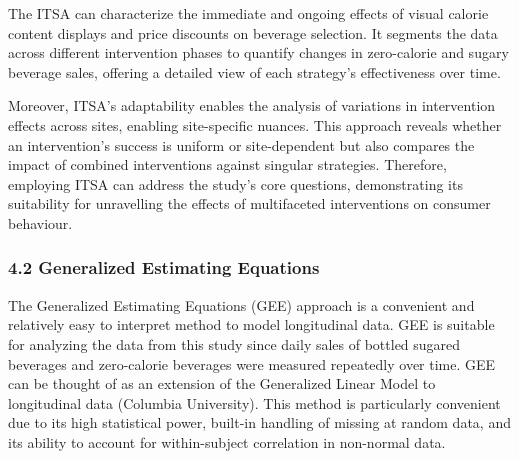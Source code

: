\documentclass[
]{article}
\begin{document}
The ITSA can characterize the immediate and ongoing effects of visual
calorie content displays and price discounts on beverage selection. It
segments the data across different intervention phases to quantify
changes in zero-calorie and sugary beverage sales, offering a detailed
view of each strategy's effectiveness over time.

Moreover, ITSA's adaptability enables the analysis of variations in
intervention effects across sites, enabling site-specific nuances. This
approach reveals whether an intervention's success is uniform or
site-dependent but also compares the impact of combined interventions
against singular strategies. Therefore, employing ITSA can address the
study's core questions, demonstrating its suitability for unravelling
the effects of multifaceted interventions on consumer behaviour.

\hypertarget{generalized-estimating-equations}{%
\subsubsection{4.2 Generalized Estimating
Equations}\label{generalized-estimating-equations}}

The Generalized Estimating Equations (GEE) approach is a convenient and
relatively easy to interpret method to model longitudinal data. GEE is
suitable for analyzing the data from this study since daily sales of
bottled sugared beverages and zero-calorie beverages were measured
repeatedly over time. GEE can be thought of as an extension of the
Generalized Linear Model to longitudinal data (Columbia University).
This method is particularly convenient due to its high statistical
power, built-in handling of missing at random data, and its ability to
account for within-subject correlation in non-normal data.
\end{document}
